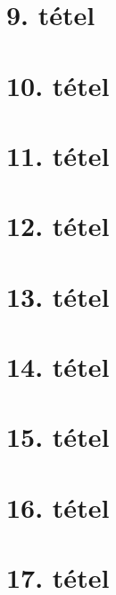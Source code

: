 \documentclass[]{article}
\begin{document}
\section{9. tétel}

\newpage
\section{10. tétel}

\newpage
\section{11. tétel}

\newpage
\section{12. tétel}

\newpage
\section{13. tétel}

\newpage
\section{14. tétel}

\newpage
\section{15. tétel}

\newpage
\section{16. tétel}

\newpage
\section{17. tétel}

\end{document}
